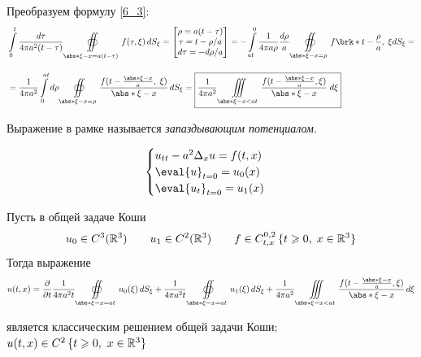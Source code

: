 \documentclass[../main.tex]{subfiles}
\begin{document}
Преобразуем формулу \eqref{6_3}: 
\begin{align*}
    &\int\limits_0^t \frac{d\tau}{4\pi a^2(t - \tau)}
    \oiint\limits_{\abs*{\xi - x} = a(t - \tau)} f(\tau, \xi)\, dS_\xi = 
    \begin{bmatrix} 
        \rho = a(t - \tau) \\
        \tau = t -\rho/a \\
        d\tau = -d\rho/a 
    \end{bmatrix} = 
    -\int\limits_{at}^0 \frac{1}{4\pi a \rho} \frac{d\rho}{a} 
    \oiint\limits_{\abs*{\xi - x} = \rho} f \brk*{t - \frac{\rho}{a},\; \xi} dS_\xi = \\[1em]
    &= \frac{1}{4\pi a^2} \int\limits_0^{at} d\rho \oiint\limits_{\abs*{\xi - x} = \rho} \frac{f(t - \frac{\abs*{\xi - x}}{a},\; \xi)}{\abs*{\xi - x}}\, dS_\xi
    = \boxed{\frac{1}{4\pi a^2} \iiint\limits_{\abs*{\xi - x} < at}\frac{f(t - \frac{\abs*{\xi - x}}{a}, \xi)}{\abs*{\xi - x}}\;d\xi}
\end{align*}

Выражение в рамке называется \emph{запаздывающим потенциалом}.

\vspace{-0.5em}
$$
\begin{cases}
    u_{tt} - a^2\Delta_x u = f(t, x) \\
    \eval{u}_{t=0} = u_0(x) \\
    \eval{u_t}_{t=0} = u_1(x)
\end{cases}
$$
\vspace{0em} %

\begin{theorem}
    Пусть в общей задаче Коши
    $$
    u_0 \in C^3(\mathbb{R}^3) \qquad 
    u_1 \in C^2(\mathbb{R}^3) \qquad 
    f \in C^{0,2}_{t,x}\,\{t \geqslant 0,\; x \in \mathbb{R}^3\} $$
    Тогда выражение
    \begin{equation*} \label{6_4}
        u(t, x) = \pd{}{t} \frac{1}{4\pi a^2t}\oiint\limits_{\abs*{\xi - x}=at}u_0(\xi)\, dS_\xi
        + \frac{1}{4\pi a^2t} \oiint\limits_{\abs*{\xi - x}=at}u_1(\xi)\, dS_\xi 
        + \frac{1}{4\pi a^2} \iiint\limits_{\abs*{\xi - x} < at} \frac{f(t - \frac{\abs*{\xi - x}}{a}, \xi)}{\abs*{\xi - x}}\, d\xi
    \end{equation*}

    является классическим решением общей задачи Коши; \; $u(t,x) \in C^2\,\{t \geqslant 0,\ x \in \mathbb{R}^3\}$
\end{theorem}
\end{document}
